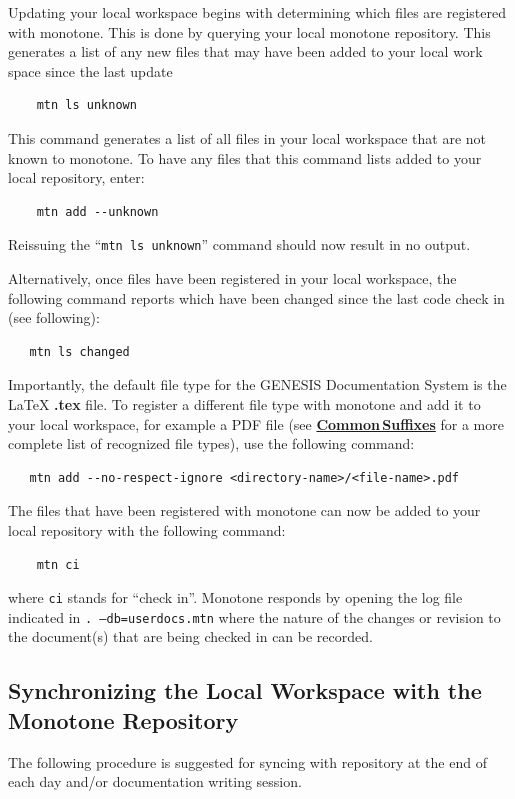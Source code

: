 \documentclass[12pt]{article}
\begin{document}
Updating your local workspace begins with determining which files are registered with monotone. This is done by querying your local monotone repository. This generates a list of any new files that may have been added to your local work space since the last update
\begin{verbatim}
    mtn ls unknown
\end{verbatim}
This command generates a list of all files in your local workspace that are not known to monotone. To have any files that this command lists added to your local repository, enter:
\begin{verbatim}
    mtn add --unknown
\end{verbatim}
Reissuing the ``{\tt mtn ls unknown}'' command should now result in no output.

Alternatively, once files have been registered in your local workspace, the following command reports which have been changed since the last code check in (see following):
\begin{verbatim}
   mtn ls changed
\end{verbatim}

Importantly, the default file type for the GENESIS Documentation System is the \LaTeX\,\,{\bf .tex} file. To register a different file type with monotone and add it to your local workspace, for example a PDF file (see \href{../common-suffixes/common-suffixes.tex}{\bf Common\,Suffixes} for a more complete list of recognized file types), use the following command:
\begin{verbatim}
   mtn add --no-respect-ignore <directory-name>/<file-name>.pdf
\end{verbatim}

The files that have been registered with monotone can now be added to your local repository with the following command:
\begin{verbatim}
    mtn ci
\end{verbatim}
where {\tt ci} stands for ``check in''. Monotone responds by opening the log file indicated in {\tt .\,--db=userdocs.mtn} where the nature of the changes or revision to the document(s) that are being checked in can be recorded.

\subsection*{Synchronizing the Local Workspace with the Monotone Repository}

The following procedure is suggested for syncing with repository at the end of each day and/or documentation writing session.
\end{document}
